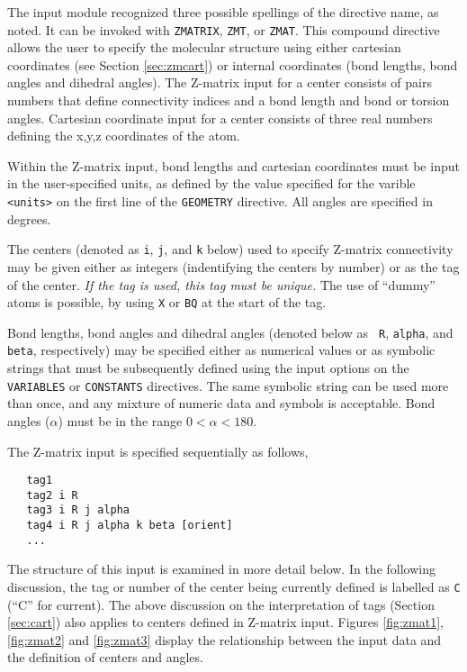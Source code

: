 The input module recognized three possible spellings of the directive name,
as noted.  It can be invoked with \verb+ZMATRIX+, \verb+ZMT+, or \verb+ZMAT+.
This compound directive allows the user to specify
the molecular structure using
either cartesian coordinates (see Section \ref{sec:zmcart}) or internal
coordinates (bond lengths, bond angles and dihedral angles).  The
Z-matrix input for a center consists of pairs numbers that define
connectivity indices and a bond length and bond or torsion angles.
Cartesian coordinate input for a center consists of three real numbers defining the
x,y,z coordinates of the atom.  

Within the Z-matrix input, bond lengths and cartesian coordinates must
be input in the user-specified units, as defined by the value specified
for the varible \verb+<units>+ on the first line of the \verb+GEOMETRY+
directive.  All angles are specified in
degrees.


The centers (denoted as \verb+i+, \verb+j+, and \verb+k+ below) used
to specify Z-matrix connectivity may be given either as integers
(indentifying the centers by number) or as the tag of the center.
{\em If the tag is used, this tag must be unique.} The use of
``dummy'' atoms is possible, by using \verb+X+ or \verb+BQ+ at the
start of the tag.

Bond lengths, bond angles and dihedral angles (denoted below as {\tt
  R}, {\tt alpha}, and {\tt beta}, respectively) may be specified either as
numerical values or as symbolic strings that must be subsequently
defined using the input options on the \verb+VARIABLES+ or 
\verb+CONSTANTS+ directives.  The same symbolic string can be used
more than once, and any
mixture of numeric data and symbols is acceptable. Bond angles
($\alpha$) must be in the range $0 < \alpha < 180$.

The Z-matrix input is specified sequentially as follows,
\begin{verbatim}
   tag1
   tag2 i R
   tag3 i R j alpha
   tag4 i R j alpha k beta [orient]
   ...
\end{verbatim}

The structure of this input is examined in more detail below.  
In the following discussion, the tag or number
of the center being currently defined is labelled as \verb+C+ (``C''
for current).  The above discussion on the interpretation of tags
(Section \ref{sec:cart}) also applies to centers defined in Z-matrix
input.  Figures \ref{fig:zmat1}, \ref{fig:zmat2} and \ref{fig:zmat3}
display the relationship between the input data and the definition of
centers and angles.

